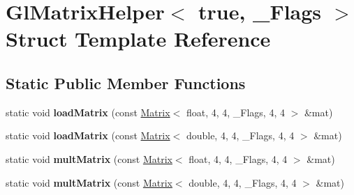 \hypertarget{struct_gl_matrix_helper_3_01true_00_01___flags_01_4}{}\section{Gl\+Matrix\+Helper$<$ true, \+\_\+\+Flags $>$ Struct Template Reference}
\label{struct_gl_matrix_helper_3_01true_00_01___flags_01_4}
\subsection*{Static Public Member Functions}
\begin{DoxyCompactItemize}
\item 
\mbox{\label{struct_gl_matrix_helper_3_01true_00_01___flags_01_4_a0814e678a578c8f1ecdd2a94fb0ebf4b}} 
static void {\bfseries load\+Matrix} (const \hyperlink{group___core___module_class_eigen_1_1_matrix}{Matrix}$<$ float, 4, 4, \+\_\+\+Flags, 4, 4 $>$ \&mat)
\item 
\mbox{\label{struct_gl_matrix_helper_3_01true_00_01___flags_01_4_a5707822f8752daa0fcf99de28c28f721}} 
static void {\bfseries load\+Matrix} (const \hyperlink{group___core___module_class_eigen_1_1_matrix}{Matrix}$<$ double, 4, 4, \+\_\+\+Flags, 4, 4 $>$ \&mat)
\item 
\mbox{\label{struct_gl_matrix_helper_3_01true_00_01___flags_01_4_a03e37f4f88e9ddfdbecd1cb1b4888ff2}} 
static void {\bfseries mult\+Matrix} (const \hyperlink{group___core___module_class_eigen_1_1_matrix}{Matrix}$<$ float, 4, 4, \+\_\+\+Flags, 4, 4 $>$ \&mat)
\item 
\mbox{\label{struct_gl_matrix_helper_3_01true_00_01___flags_01_4_a13ebaff15d47f5da6142a76e8f070bdc}} 
static void {\bfseries mult\+Matrix} (const \hyperlink{group___core___module_class_eigen_1_1_matrix}{Matrix}$<$ double, 4, 4, \+\_\+\+Flags, 4, 4 $>$ \&mat)
\item 
\mbox{\label{struct_gl_matrix_helper_3_01true_00_01___flags_01_4_a0814e678a578c8f1ecdd2a94fb0ebf4b}} 

\end{DoxyCompactItemize}
